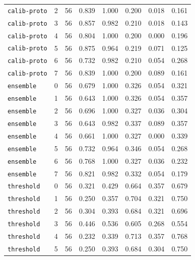 \documentclass{article}
\begin{document}
\begin{center}
{\begin{tabular}{lllccccc}
\texttt{calib-proto} & 2 & 56 & 0.839 & 1.000 & 0.200 & 0.018 & 0.161 \\
\texttt{calib-proto} & 3 & 56 & 0.857 & 0.982 & 0.210 & 0.018 & 0.143 \\
\texttt{calib-proto} & 4 & 56 & 0.804 & 1.000 & 0.200 & 0.000 & 0.196 \\
\texttt{calib-proto} & 5 & 56 & 0.875 & 0.964 & 0.219 & 0.071 & 0.125 \\
\texttt{calib-proto} & 6 & 56 & 0.732 & 0.982 & 0.210 & 0.054 & 0.268 \\
\texttt{calib-proto} & 7 & 56 & 0.839 & 1.000 & 0.200 & 0.089 & 0.161 \\
\texttt{ensemble} & 0 & 56 & 0.679 & 1.000 & 0.326 & 0.054 & 0.321 \\
\texttt{ensemble} & 1 & 56 & 0.643 & 1.000 & 0.326 & 0.054 & 0.357 \\
\texttt{ensemble} & 2 & 56 & 0.696 & 1.000 & 0.327 & 0.036 & 0.304 \\
\texttt{ensemble} & 3 & 56 & 0.643 & 0.982 & 0.337 & 0.089 & 0.357 \\
\texttt{ensemble} & 4 & 56 & 0.661 & 1.000 & 0.327 & 0.000 & 0.339 \\
\texttt{ensemble} & 5 & 56 & 0.732 & 0.964 & 0.346 & 0.054 & 0.268 \\
\texttt{ensemble} & 6 & 56 & 0.768 & 1.000 & 0.327 & 0.036 & 0.232 \\
\texttt{ensemble} & 7 & 56 & 0.821 & 0.982 & 0.332 & 0.054 & 0.179 \\
\texttt{threshold} & 0 & 56 & 0.321 & 0.429 & 0.664 & 0.357 & 0.679 \\
\texttt{threshold} & 1 & 56 & 0.250 & 0.357 & 0.704 & 0.321 & 0.750 \\
\texttt{threshold} & 2 & 56 & 0.304 & 0.393 & 0.684 & 0.321 & 0.696 \\
\texttt{threshold} & 3 & 56 & 0.446 & 0.536 & 0.605 & 0.268 & 0.554 \\
\texttt{threshold} & 4 & 56 & 0.232 & 0.339 & 0.713 & 0.357 & 0.768 \\
\texttt{threshold} & 5 & 56 & 0.250 & 0.393 & 0.684 & 0.304 & 0.750 \\
\bottomrule
\end{tabular}%
}
\end{center}
\end{document}
